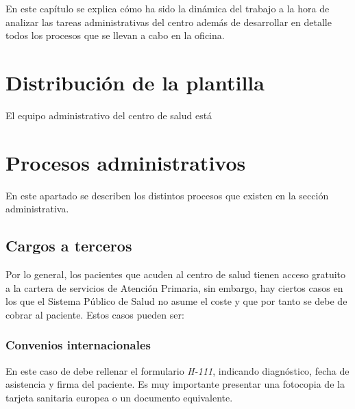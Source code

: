 En este capítulo se explica cómo ha sido la dinámica del trabajo a la hora de analizar las tareas administrativas del centro además de desarrollar en detalle todos los procesos que se llevan a cabo en la oficina.

\section{Distribución de la plantilla}

El equipo administrativo del centro de salud está 

\section{Procesos administrativos}

En este apartado se describen los distintos procesos que existen en la sección administrativa. 




\subsection{Cargos a terceros}

Por lo general, los pacientes que acuden al centro de salud tienen acceso gratuito a la cartera de servicios de Atención Primaria, sin embargo, hay ciertos casos en los que el Sistema Público de Salud no asume el coste y que por tanto se debe de cobrar al paciente.
Estos casos pueden ser:

\subsubsection{Convenios internacionales}

En este caso de debe rellenar el formulario \textit{H-111}, indicando diagnóstico, fecha de asistencia y firma del paciente.
Es muy importante presentar una fotocopia de la tarjeta sanitaria europea o un documento equivalente.

